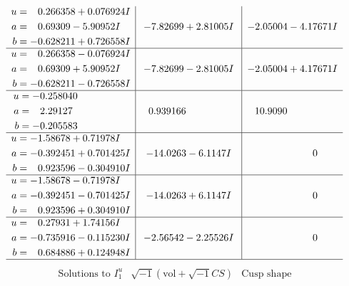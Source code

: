 \documentclass[1p]{elsarticle_modified}
\theoremstyle{definition}
\newcommand{\I}{\sqrt{-1}}
\begin{document}
$$\begin{array}{c|c|c}
\begin{aligned}
u &= \phantom{-}0.266358 + 0.076924 I \\
a &= \phantom{-}0.69309 - 5.90952 I \\
b &= -0.628211 + 0.726558 I\end{aligned}
 & -7.82699 + 2.81005 I & -2.05004 - 4.17671 I \\ \hline\begin{aligned}
u &= \phantom{-}0.266358 - 0.076924 I \\
a &= \phantom{-}0.69309 + 5.90952 I \\
b &= -0.628211 - 0.726558 I\end{aligned}
 & -7.82699 - 2.81005 I & -2.05004 + 4.17671 I \\ \hline\begin{aligned}
u &= -0.258040\phantom{ +0.000000I} \\
a &= \phantom{-}2.29127\phantom{ +0.000000I} \\
b &= -0.205583\phantom{ +0.000000I}\end{aligned}
 & \phantom{-}0.939166\phantom{ +0.000000I} & \phantom{-}10.9090\phantom{ +0.000000I} \\ \hline\begin{aligned}
u &= -1.58678 + 0.71978 I \\
a &= -0.392451 + 0.701425 I \\
b &= \phantom{-}0.923596 - 0.304910 I\end{aligned}
 & -14.0263 - 6.1147 I & \phantom{-0.000000 } 0 \\ \hline\begin{aligned}
u &= -1.58678 - 0.71978 I \\
a &= -0.392451 - 0.701425 I \\
b &= \phantom{-}0.923596 + 0.304910 I\end{aligned}
 & -14.0263 + 6.1147 I & \phantom{-0.000000 } 0 \\ \hline\begin{aligned}
u &= \phantom{-}0.27931 + 1.74156 I \\
a &= -0.735916 - 0.115230 I \\
b &= \phantom{-}0.684886 + 0.124948 I\end{aligned}
 & -2.56542 - 2.25526 I & \phantom{-0.000000 } 0\\
 \hline 
 \end{array}$$\newpage$$\begin{array}{c|c|c}  
\text{Solutions to }I^u_{1}& \I (\text{vol} + \sqrt{-1}CS) & \text{Cusp shape}\\
 \hline 
\begin{aligned}

\end{aligned}
\end{array}$$
\end{document}
